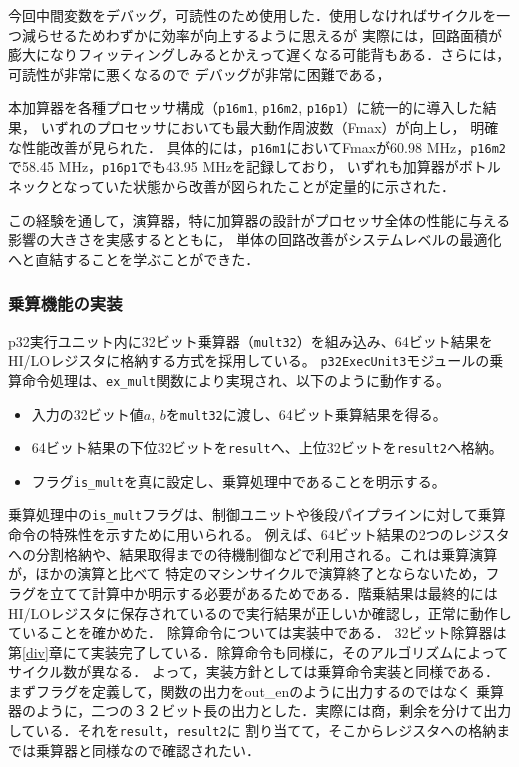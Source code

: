 \documentclass[autodetect-engine,dvi=dvipdfmx,ja=standard,
               a4j,11pt]{bxjsarticle}
\begin{document}
今回中間変数をデバッグ，可読性のため使用した．使用しなければサイクルを一つ減らせるためわずかに効率が向上するように思えるが
実際には，回路面積が膨大になりフィッティングしみるとかえって遅くなる可能背もある．さらには，可読性が非常に悪くなるので
デバッグが非常に困難である，

本加算器を各種プロセッサ構成（\texttt{p16m1}, \texttt{p16m2}, \texttt{p16p1}）に統一的に導入した結果，
いずれのプロセッサにおいても最大動作周波数（Fmax）が向上し，
明確な性能改善が見られた．
具体的には，\texttt{p16m1}においてFmaxが60.98 MHz，\texttt{p16m2}で58.45 MHz，\texttt{p16p1}でも43.95 MHzを記録しており，
いずれも加算器がボトルネックとなっていた状態から改善が図られたことが定量的に示された．

この経験を通して，演算器，特に加算器の設計がプロセッサ全体の性能に与える影響の大きさを実感するとともに，
単体の回路改善がシステムレベルの最適化へと直結することを学ぶことができた．
\subsubsection{乗算機能の実装}
p32実行ユニット内に32ビット乗算器（\texttt{mult32}）を組み込み、64ビット結果をHI/LOレジスタに格納する方式を採用している。  
\texttt{p32ExecUnit3}モジュールの乗算命令処理は、\texttt{ex\_mult}関数により実現され、以下のように動作する。

\begin{itemize}
  \item 入力の32ビット値$a$, $b$を\texttt{mult32}に渡し、64ビット乗算結果を得る。
  \item 64ビット結果の下位32ビットを\texttt{result}へ、上位32ビットを\texttt{result2}へ格納。
  \item フラグ\texttt{is\_mult}を真に設定し、乗算処理中であることを明示する。
\end{itemize}

乗算処理中の\texttt{is\_mult}フラグは、制御ユニットや後段パイプラインに対して乗算命令の特殊性を示すために用いられる。
例えば、64ビット結果の2つのレジスタへの分割格納や、結果取得までの待機制御などで利用される。これは乗算演算が，ほかの演算と比べて
特定のマシンサイクルで演算終了とならないため，フラグを立てて計算中か明示する必要があるためである．階乗結果は最終的には
HI/LOレジスタに保存されているので実行結果が正しいか確認し，正常に動作していることを確かめた．
除算命令については実装中である．
32ビット除算器は第\ref{div}章にて実装完了している．除算命令も同様に，そのアルゴリズムによってサイクル数が異なる．
よって，実装方針としては乗算命令実装と同様である．まずフラグを定義して，関数の出力をout\_enのように出力するのではなく
乗算器のように，二つの３２ビット長の出力とした．実際には商，剰余を分けて出力している．それを\verb|result|，\verb|result2|に
割り当てて，そこからレジスタへの格納までは乗算器と同様なので確認されたい．
\end{document}
